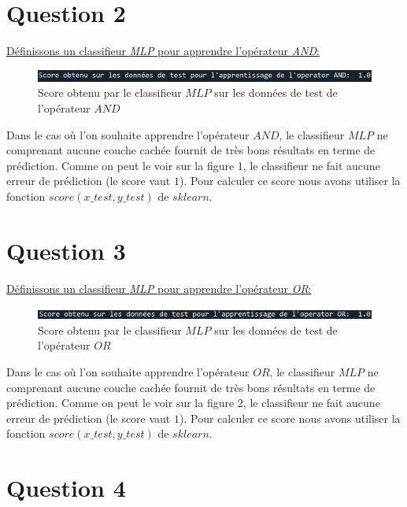 \documentclass[a4paper,french,10pt]{article}
\begin{document}
	\section{Question 2}
	
	\underline{Définissons un classifieur \textit{MLP} pour apprendre l’opérateur \textit{AND}:}
	
	
	
	\begin{figure}[H]
		\centering
		\includegraphics[scale=0.7]{images/Q2.png}
		\caption{Score obtenu par le classifieur $MLP$ sur les données de test de l'opérateur $AND$}
	\end{figure}
	Dans le cas où l'on souhaite apprendre l'opérateur $AND$, le classifieur $MLP$ ne comprenant aucune couche cachée fournit de très bons résultats en terme de prédiction. Comme on peut le voir sur la figure 1, le classifieur ne fait aucune erreur de prédiction (le score vaut $1$). Pour calculer ce score nous avons utiliser la fonction $score(x\_test, y\_test)$ de $sklearn$.
	\section{Question 3}
	
	\underline{Définissons un classifieur \textit{MLP} pour apprendre l’opérateur \textit{OR}:}
	
	
	
	\begin{figure}[H]
		\centering
		\includegraphics[scale=0.7]{images/Q3.png}
		\caption{Score obtenu par le classifieur $MLP$ sur les données de test de l'opérateur $OR$}
	\end{figure}
	Dans le cas où l'on souhaite apprendre l'opérateur $OR$, le classifieur $MLP$ ne comprenant aucune couche cachée fournit de très bons résultats en terme de prédiction. Comme on peut le voir sur la figure 2, le classifieur ne fait aucune erreur de prédiction (le score vaut $1$). Pour calculer ce score nous avons utiliser la fonction $score(x\_test, y\_test)$ de $sklearn$.
	
	\section{Question 4}
\end{document}
